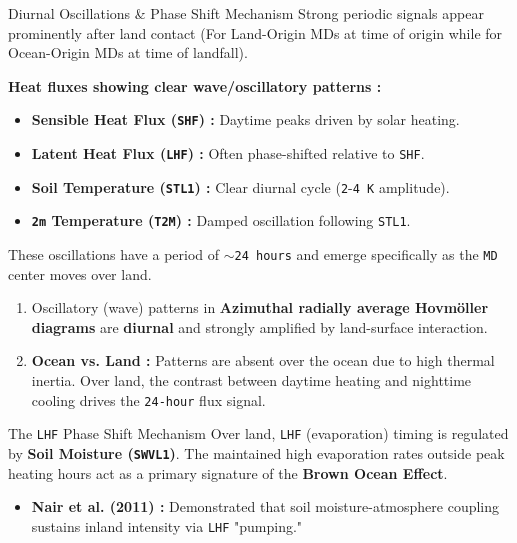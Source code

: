 \documentclass[8pt, aspectratio=169]{beamer}
\begin{document}
\begin{frame}{Diurnal Oscillations \& Phase Shift Mechanism}
    Strong periodic signals appear prominently after land contact (For Land-Origin MDs at time of origin while for Ocean-Origin MDs at time of landfall).

    \vspace{0.2cm}
    \footnotesize
    \textbf{Heat fluxes showing clear wave/oscillatory patterns :}
    \begin{itemize}
        \item \textbf{Sensible Heat Flux (\texttt{SHF}) :} Daytime peaks driven by solar heating.
        \item \textbf{Latent Heat Flux (\texttt{LHF}) :} Often phase-shifted relative to \texttt{SHF}.
        \item \textbf{Soil Temperature (\texttt{STL1}) :} Clear diurnal cycle (\texttt{2}-\texttt{4 K} amplitude).
        \item \textbf{\texttt{2m} Temperature (\texttt{T2M}) :} Damped oscillation following \texttt{STL1}.
    \end{itemize}

    \vspace{0.2cm}
    \footnotesize
    These oscillations have a period of \texttt{$\sim$24 hours} and emerge specifically as the \texttt{MD} center moves over land.
    \begin{enumerate}
        \item Oscillatory (wave) patterns in \textbf{Azimuthal radially average Hovm\"oller diagrams} are \textbf{diurnal} and strongly amplified by land-surface interaction.
        \item \textbf{Ocean vs. Land :} Patterns are absent over the ocean due to high thermal inertia. Over land, the contrast between daytime heating and nighttime cooling drives the \texttt{24-hour} flux signal.
    \end{enumerate}

    \begin{block}{The \texttt{LHF} Phase Shift Mechanism}
        Over land, \texttt{LHF} (evaporation) timing is regulated by \textbf{Soil Moisture (\texttt{SWVL1})}. The maintained high evaporation rates outside peak heating hours act as a primary signature of the \textbf{Brown Ocean Effect}. \cite{nair2011influence} %
    \end{block}

    \vfill
    \noindent\makebox[\linewidth]{\rule{\paperwidth}{0.4pt}}
    \vspace{-0.2cm}
    \tiny
    \begin{itemize}
        \item \textbf{Nair et al. (2011) \cite{nair2011influence} :} Demonstrated that soil moisture-atmosphere coupling sustains inland intensity via \texttt{LHF} "pumping."
    \end{itemize}
\end{frame}
\end{document}
